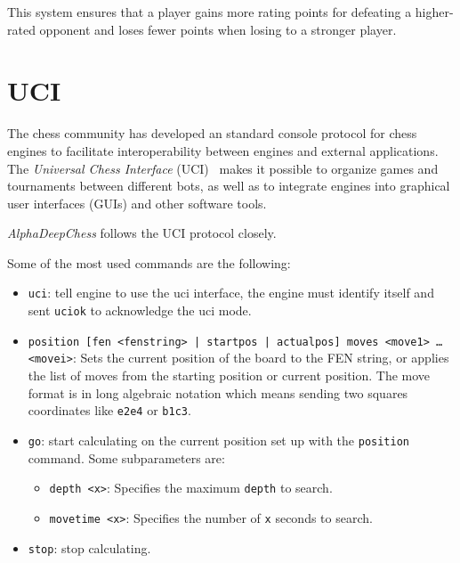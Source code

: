 This system ensures that a player gains more rating points for defeating a higher-rated opponent and loses fewer points when losing to a stronger player.

\newpage

\section{UCI}
\label{sec:uci}

\noindent The chess community has developed an standard console protocol for chess engines to facilitate interoperability between engines and external applications. The \textit{Universal Chess Interface} (UCI)~\cite{UciProtocol} makes it possible to organize games and tournaments between different bots, as well as to integrate engines into graphical user interfaces (GUIs) and other software tools.

\vspace{1em}

\textit{AlphaDeepChess} follows the UCI protocol closely.

\vspace{1em}

\noindent Some of the most used commands are the following:

\begin{itemize}[itemsep=1pt]

    \item \texttt{uci}: tell engine to use the uci interface, the engine must identify itself and sent \texttt{uciok} to acknowledge the uci mode.
    \item \texttt{position [fen <fenstring> | startpos | actualpos] moves <move1> \ldots \\<movei>}: Sets the current position of the board to the FEN string, or applies the list of moves from the starting position or current position. The move format is in long algebraic notation which means sending two squares coordinates like \texttt{e2e4} or \texttt{b1c3}.

    \item \texttt{go}: start calculating on the current position set up with the \texttt{position} command. Some  subparameters are:
    \begin{itemize}[itemsep=1pt]
        \item \texttt{depth <x>}: Specifies the maximum \texttt{depth} to search.
        \item \texttt{movetime <x>}: Specifies the number of \texttt{x} seconds to search. 
    \end{itemize}

    \item \texttt{stop}: stop calculating.
\end{itemize}

